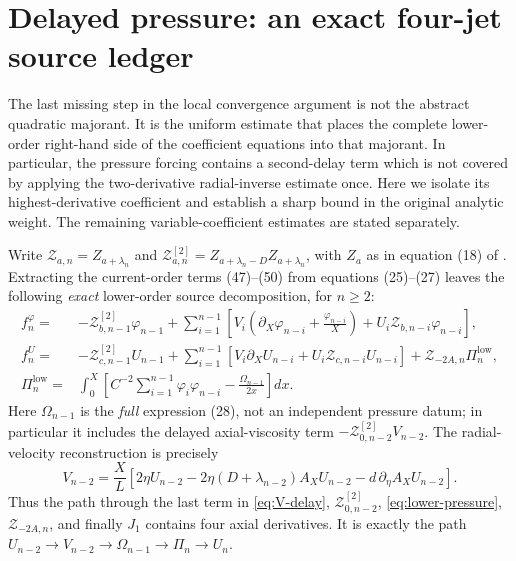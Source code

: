 \section{Delayed pressure: an exact four-jet source ledger}\label{sec:delayed-pressure}
The last missing step in the local convergence argument is not the abstract
quadratic majorant. It is the uniform estimate that places the complete
lower-order right-hand side of the coefficient equations into that majorant.
In particular, the pressure forcing contains a second-delay term which is
not covered by applying the two-derivative radial-inverse estimate once.
Here we isolate its highest-derivative coefficient and establish a sharp
bound in the original analytic weight. The remaining variable-coefficient
estimates are stated separately.

Write $\mathcal Z_{a,n}=Z_{a+\lambda_n}$ and
$\mathcal Z^{[2]}_{a,n}=Z_{a+\lambda_n-D}Z_{a+\lambda_n}$,
with $Z_a$ as in equation (18) of \cite{newton2026}. Extracting the
current-order terms (47)--(50) from equations (25)--(27) leaves the
following \emph{exact} lower-order source decomposition, for $n\ge2$:
\begin{align}
 f_n^\varphi={}&-\mathcal Z^{[2]}_{b,n-1}\varphi_{n-1}
 +\sum_{i=1}^{n-1}\left[
 V_i\left(\partial_X\varphi_{n-i}+\frac{\varphi_{n-i}}X\right)
 +U_i\mathcal Z_{b,n-i}\varphi_{n-i}\right],
 \label{eq:lower-swirl}\\
 f_n^U={}&-\mathcal Z^{[2]}_{c,n-1}U_{n-1}
 +\sum_{i=1}^{n-1}\left[V_i\partial_XU_{n-i}
 +U_i\mathcal Z_{c,n-i}U_{n-i}\right]
 +\mathcal Z_{-2A,n}\Pi_n^{\mathrm{low}},
 \label{eq:lower-axial}\\
 \Pi_n^{\mathrm{low}}={}&\int_0^X\left[
 C^{-2}\sum_{i=1}^{n-1}\varphi_i\varphi_{n-i}
 -\frac{\Omega_{n-1}}{2x}\right]dx.
 \label{eq:lower-pressure}
\end{align}
Here $\Omega_{n-1}$ is the \emph{full} expression (28), not an
independent pressure datum; in particular it includes the delayed
axial-viscosity term $-\mathcal Z^{[2]}_{0,n-2}V_{n-2}$.
The radial-velocity reconstruction is precisely
\begin{equation}\label{eq:V-delay}
 V_{n-2}=\frac X L\left[2\eta U_{n-2}
 -2\eta(D+\lambda_{n-2})A_XU_{n-2}
 -d\,\partial_\eta A_XU_{n-2}\right].
\end{equation}
Thus the path through the last term in \eqref{eq:V-delay},
$\mathcal Z^{[2]}_{0,n-2}$, \eqref{eq:lower-pressure},
$\mathcal Z_{-2A,n}$, and finally $J_1$ contains four axial
derivatives. It is exactly the path
$U_{n-2}\to V_{n-2}\to\Omega_{n-1}\to\Pi_n\to U_n$.
